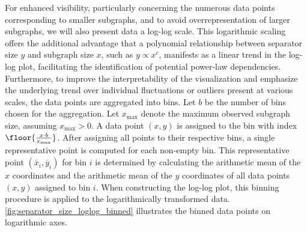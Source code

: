 For enhanced visibility, particularly concerning the numerous data points corresponding to smaller subgraphs, and to avoid overrepresentation of larger subgraphs, we will also present data a log-log scale.
This logarithmic scaling offers the additional advantage that a polynomial relationship between separator size \( y \) and subgraph size \( x \), such as \( y \propto x^c \), manifests as a linear trend in the log-log plot, facilitating the identification of potential power-law dependencies.
Furthermore, to improve the interpretability of the visualization and emphasize the underlying trend over individual fluctuations or outliers present at various scales, the data points are aggregated into bins.
Let \( b \) be the number of bins chosen for the aggregation.
Let \( x_{\max} \) denote the maximum observed subgraph size, assuming \( x_{\max} > 0 \).
A data point \( (x, y) \) is assigned to the bin with index \( \floor{\frac{x \cdot b}{x_{\max}}} \).
After assigning all points to their respective bins, a single representative point is computed for each non-empty bin.
This representative point \( (\overline{x}_i, \overline{y}_i) \) for bin \( i \) is determined by calculating the arithmetic mean of the \( x \) coordinates and the arithmetic mean of the \( y \) coordinates of all data points \( (x, y) \) assigned to bin \( i \).
When constructing the log-log plot, this binning procedure is applied to the logarithmically transformed data.
\cref{fig:separator_size_loglog_binned} illustrates the binned data points on logarithmic axes.

